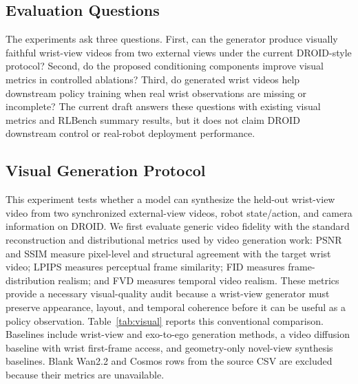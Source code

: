 \documentclass[letterpaper]{article}
\begin{document}
\subsection{Evaluation Questions}

The experiments ask three questions.
First, can the generator produce visually faithful wrist-view videos from two external views under the current DROID-style protocol?
Second, do the proposed conditioning components improve visual metrics in controlled ablations?
Third, do generated wrist videos help downstream policy training when real wrist observations are missing or incomplete?
The current draft answers these questions with existing visual metrics and RLBench summary results, but it does not claim DROID downstream control or real-robot deployment performance.

\subsection{Visual Generation Protocol}

This experiment tests whether a model can synthesize the held-out wrist-view video from two synchronized external-view videos, robot state/action, and camera information on DROID.
We first evaluate generic video fidelity with the standard reconstruction and distributional metrics used by video generation work: PSNR and SSIM measure pixel-level and structural agreement with the target wrist video; LPIPS measures perceptual frame similarity; FID measures frame-distribution realism; and FVD measures temporal video realism.
These metrics provide a necessary visual-quality audit because a wrist-view generator must preserve appearance, layout, and temporal coherence before it can be useful as a policy observation.
Table~\ref{tab:visual} reports this conventional comparison.
Baselines include wrist-view and exo-to-ego generation methods, a video diffusion baseline with wrist first-frame access, and geometry-only novel-view synthesis baselines.
Blank Wan2.2 and Cosmos rows from the source CSV are excluded because their metrics are unavailable.
\end{document}
